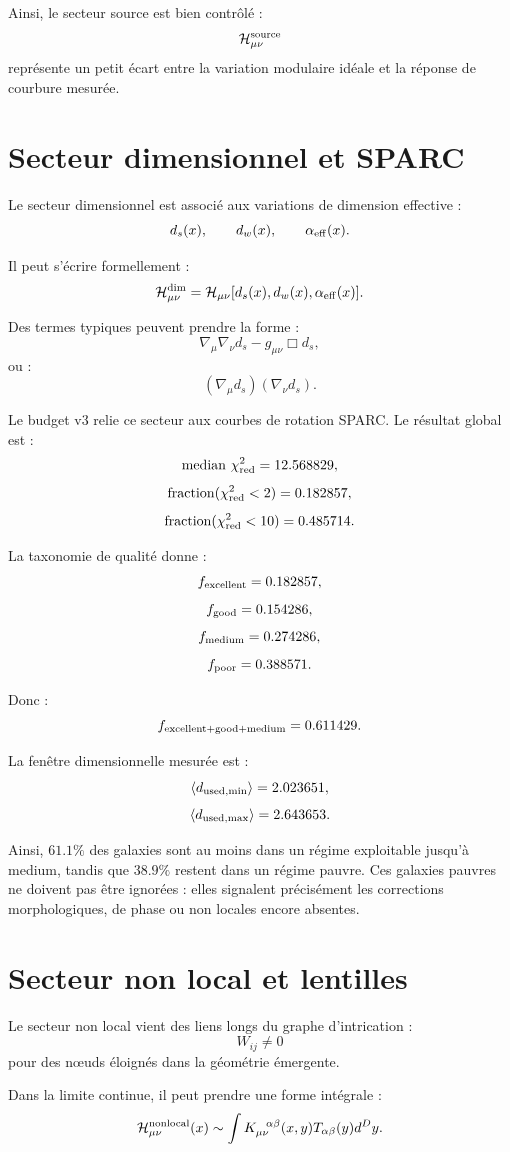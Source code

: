 \documentclass[11pt,a4paper]{article}
\begin{document}
Ainsi, le secteur source est bien contrôlé :
\[
\mathcal{H}_{\mu\nu}^{\rm source}
\]
représente un petit écart entre la variation modulaire idéale et la réponse de
courbure mesurée.

\section{Secteur dimensionnel et SPARC}

Le secteur dimensionnel est associé aux variations de dimension effective :
\[
d_s(x),
\qquad
d_w(x),
\qquad
\alpha_{\rm eff}(x).
\]

Il peut s'écrire formellement :
\[
\mathcal{H}_{\mu\nu}^{\rm dim}
=
\mathcal{H}_{\mu\nu}
[
d_s(x),
d_w(x),
\alpha_{\rm eff}(x)
].
\]

Des termes typiques peuvent prendre la forme :
\[
\nabla_\mu\nabla_\nu d_s
-
g_{\mu\nu}\Box d_s,
\]
ou :
\[
(\nabla_\mu d_s)(\nabla_\nu d_s).
\]

Le budget v3 relie ce secteur aux courbes de rotation SPARC. Le résultat
global est :
\[
{\rm median}\ \chi^2_{\rm red}=12.568829,
\]
\[
{\rm fraction}(\chi^2_{\rm red}<2)=0.182857,
\]
\[
{\rm fraction}(\chi^2_{\rm red}<10)=0.485714.
\]

La taxonomie de qualité donne :
\[
f_{\rm excellent}=0.182857,
\]
\[
f_{\rm good}=0.154286,
\]
\[
f_{\rm medium}=0.274286,
\]
\[
f_{\rm poor}=0.388571.
\]

Donc :
\[
f_{\rm excellent+good+medium}=0.611429.
\]

La fenêtre dimensionnelle mesurée est :
\[
\langle d_{\rm used,min}\rangle=2.023651,
\]
\[
\langle d_{\rm used,max}\rangle=2.643653.
\]

Ainsi, \(61.1\%\) des galaxies sont au moins dans un régime exploitable jusqu'à
medium, tandis que \(38.9\%\) restent dans un régime pauvre. Ces galaxies
pauvres ne doivent pas être ignorées : elles signalent précisément les
corrections morphologiques, de phase ou non locales encore absentes.

\section{Secteur non local et lentilles}

Le secteur non local vient des liens longs du graphe d'intrication :
\[
W_{ij}\neq0
\]
pour des nœuds éloignés dans la géométrie émergente.

Dans la limite continue, il peut prendre une forme intégrale :
\[
\mathcal{H}_{\mu\nu}^{\rm nonlocal}(x)
\sim
\int
K_{\mu\nu}^{\ \ \alpha\beta}(x,y)
T_{\alpha\beta}(y)
d^Dy.
\]
\end{document}
